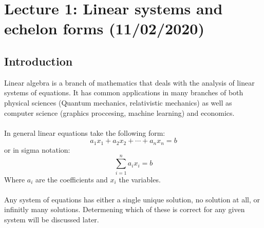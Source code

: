\documentclass[11pt, a4paper]{article}
\begin{document}
\section{Lecture 1: Linear systems and echelon forms (11/02/2020)}
\subsection{Introduction}
Linear algebra is a branch of mathematics that deals with the analysis of linear systems
of equations. It has common applications in many branches of both physical sciences (Quantum mechanics, relativistic mechanics) as well
as computer science (graphics proccesing, machine learning) and economics.\\
\\
In general linear equations take the following form:
\begin{equation}
    a_1x_1 + a_2x_2 + \cdots + a_nx_n = b
\end{equation}
or in sigma notation:
\begin{equation}
    \sum_{i=1}^{n} a_ix_i = b
\end{equation}
Where $a_i$ are the coefficients and $x_i$ the variables.\\
\\
Any system of equations has either a single unique solution, no solution at all, 
or infinitly many solutions. Determening which of these is correct for any given system will be discussed later.
\end{document}
